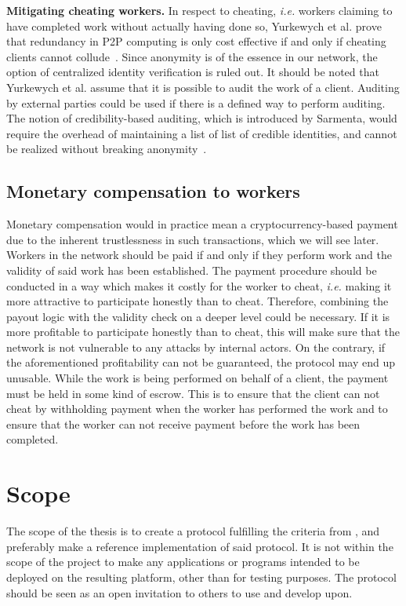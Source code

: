 \textbf{Mitigating cheating workers.}
In respect to cheating, \textit{i.e.} workers claiming to have completed work without actually having done so, Yurkewych et al. prove that redundancy in P2P computing is only cost effective if and only if cheating clients cannot collude~\cite{yurkewych:2005}. Since anonymity is of the essence in our network, the option of centralized identity verification is ruled out. It should be noted that Yurkewych et al. assume that it is possible to audit the work of a client. Auditing by external parties could be used if there is a defined way to perform auditing. The notion of credibility-based auditing, which is introduced by Sarmenta, would require the overhead of maintaining a list of list of credible identities, and cannot be realized without breaking anonymity~\cite{sarmenta:2002}.

\subsection{Monetary compensation to workers}
\label{sec:prob:compensation}
Monetary compensation would in practice mean a cryptocurrency-based payment due to the inherent trustlessness in such transactions, which we will see later. Workers in the network should be paid if and only if they perform work and the validity of said work has been established. The payment procedure should be conducted in a way which makes it costly for the worker to cheat, \textit{i.e.} making it more attractive to participate honestly than to cheat. Therefore, combining the payout logic with the validity check on a deeper level could be necessary. If it is more profitable to participate honestly than to cheat, this will make sure that the network is not vulnerable to any attacks by internal actors. On the contrary, if the aforementioned profitability can not be guaranteed, the protocol may end up unusable. While the work is being performed on behalf of a client, the payment must be held in some kind of escrow. This is to ensure that the client can not cheat by withholding payment when the worker has performed the work and to ensure that the worker can not receive payment before the work has been completed.

\section{Scope}
The scope of the thesis is to create a protocol fulfilling the criteria from , and preferably make a reference implementation of said protocol. It is not within the scope of the project to make any applications or programs intended to be deployed on the resulting platform, other than for testing purposes. The protocol should be seen as an open invitation to others to use and develop upon.

